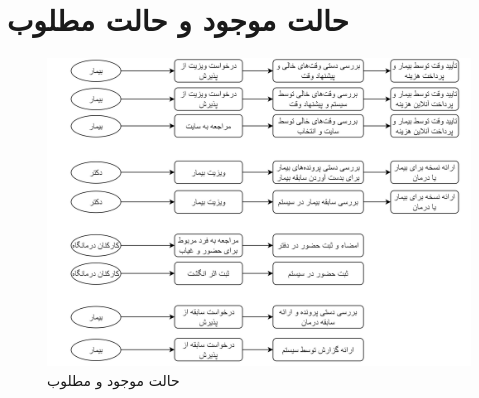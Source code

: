 \documentclass[a4paper,12pt]{article}
\begin{document}
	\pagebreak
	\section{حالت موجود و حالت  مطلوب}\label{sec7}
	\begin{figure}[!h]
		\centering
		\includegraphics[width=.9\linewidth]{state.png}
		\caption{حالت موجود و مطلوب}
		\label{fig1:sec7}
	\end{figure}
\end{document}
